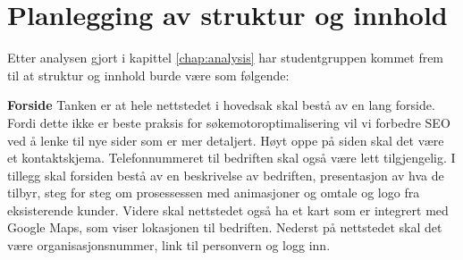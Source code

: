 








\section{Planlegging av struktur og innhold}

Etter analysen gjort i kapittel \ref{chap:analysis} har studentgruppen kommet frem til at struktur og innhold burde være som følgende: 

\textbf{Forside} Tanken er at hele nettstedet i hovedsak skal bestå av en lang forside. Fordi dette ikke er beste praksis for søkemotoroptimalisering vil vi forbedre SEO ved å lenke til nye sider som er mer detaljert. Høyt oppe på siden skal det være et kontaktskjema. Telefonnummeret til bedriften skal også være lett tilgjengelig. I tillegg skal forsiden bestå av en beskrivelse av bedriften, presentasjon av hva de tilbyr, steg for steg om prosessessen med animasjoner og omtale og logo fra eksisterende kunder. Videre skal nettstedet også ha et kart som er integrert med Google Maps, som viser lokasjonen til bedriften. Nederst på nettstedet skal det være organisasjonsnummer, link til personvern og logg inn.


